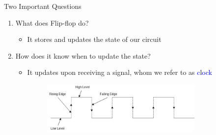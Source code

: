 \begin{frame}{Two Important Questions}
\begin{enumerate}
    \item What does Flip-flop do?
    \begin{itemize}
        \item It stores and updates the state of our circuit
    \end{itemize}
    \pause
     \item How does it know when to update the state?
    \begin{itemize}
        \item It updates upon receiving a signal, whom we refer to as \textcolor{blue}{clock}
        \break
        \begin{figure}
            \centering
            \includegraphics[width=0.8\textwidth]{download.png}
            \label{fig:my_label}
        \end{figure}
    \end{itemize}
\end{enumerate}
\end{frame}